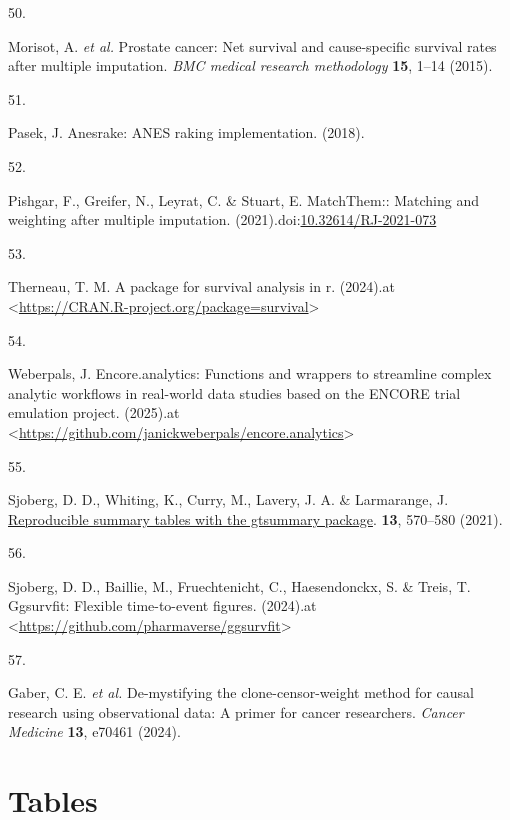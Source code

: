 \documentclass[
  letterpaper,
  DIV=11,
  numbers=noendperiod]{scrartcl}
\newlength{\cslhangindent}
\newlength{\csllabelwidth}
\newenvironment{CSLReferences}[2] %
 {\begin{list}{}{%
  \setlength{\itemindent}{0pt}
  \setlength{\leftmargin}{0pt}
  \setlength{\parsep}{0pt}
  \ifodd #1
   \setlength{\leftmargin}{\cslhangindent}
   \setlength{\itemindent}{-1\cslhangindent}
  \fi
  \setlength{\itemsep}{#2\baselineskip}}}
 {\end{list}}
\newcommand{\CSLLeftMargin}[1]{\parbox[t]{\csllabelwidth}{\strut#1\strut}}
\newcommand{\CSLRightInline}[1]{\parbox[t]{\linewidth - \csllabelwidth}{\strut#1\strut}}
\begin{document}
\begin{CSLReferences}{0}{0}
\CSLLeftMargin{50. }%
\CSLRightInline{Morisot, A. \emph{et al.} Prostate cancer: Net survival
and cause-specific survival rates after multiple imputation. \emph{BMC
medical research methodology} \textbf{15}, 1--14 (2015).}

\CSLLeftMargin{51. }%
\CSLRightInline{Pasek, J. Anesrake: ANES raking implementation. (2018).}

\CSLLeftMargin{52. }%
\CSLRightInline{Pishgar, F., Greifer, N., Leyrat, C. \& Stuart, E.
MatchThem:: Matching and weighting after multiple imputation.
(2021).doi:\href{https://doi.org/10.32614/RJ-2021-073}{10.32614/RJ-2021-073}}

\CSLLeftMargin{53. }%
\CSLRightInline{Therneau, T. M. A package for survival analysis in r.
(2024).at
\textless{}\url{https://CRAN.R-project.org/package=survival}\textgreater{}}

\CSLLeftMargin{54. }%
\CSLRightInline{Weberpals, J. Encore.analytics: Functions and wrappers
to streamline complex analytic workflows in real-world data studies
based on the ENCORE trial emulation project. (2025).at
\textless{}\url{https://github.com/janickweberpals/encore.analytics}\textgreater{}}

\CSLLeftMargin{55. }%
\CSLRightInline{Sjoberg, D. D., Whiting, K., Curry, M., Lavery, J. A. \&
Larmarange, J. \href{https://doi.org/10.32614/RJ-2021-053}{Reproducible
summary tables with the gtsummary package}. \textbf{13}, 570--580
(2021).}

\CSLLeftMargin{56. }%
\CSLRightInline{Sjoberg, D. D., Baillie, M., Fruechtenicht, C.,
Haesendonckx, S. \& Treis, T. Ggsurvfit: Flexible time-to-event figures.
(2024).at
\textless{}\url{https://github.com/pharmaverse/ggsurvfit}\textgreater{}}

\CSLLeftMargin{57. }%
\CSLRightInline{Gaber, C. E. \emph{et al.} De-mystifying the
clone-censor-weight method for causal research using observational data:
A primer for cancer researchers. \emph{Cancer Medicine} \textbf{13},
e70461 (2024).}

\end{CSLReferences}

\newpage{}

\section*{Tables}\label{tables}
\end{document}
